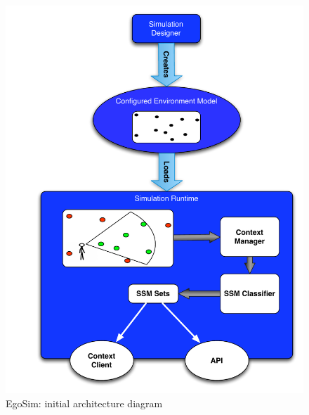 \begin{figure}[H]
	\centering
	\includegraphics[width=0.8\linewidth]{gfx/Chapter3/initial_architecture}
	\caption{EgoSim: initial architecture diagram}
	\label{fig:initial_architecture}
\end{figure}


